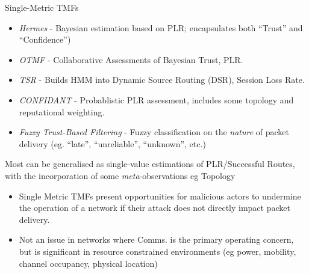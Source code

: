 \documentclass{beamer}
\begin{document}
\begin{frame}[allowframebreaks]{Single-Metric TMFs}
  \begin{itemize}
    \item \emph{Hermes} \cite{Zouridaki2005} - Bayesian estimation based on PLR; encapsulates both ``Trust'' and ``Confidence'')
    \item \emph{OTMF} \cite{Li2008} - Collaborative Assessments of Bayesian Trust, PLR.
    \item \emph{TSR} \cite{Moe2008a} - Builds HMM into Dynamic Source Routing (DSR), Session Loss Rate.
    \item \emph{CONFIDANT} \cite{Buchegger2002} - Probablistic PLR assessment, includes some topology and reputational weighting.
    \item \emph{Fuzzy Trust-Based Filtering} \cite{Luo2008} - Fuzzy classification on the \emph{nature} of packet delivery (eg. ``late'', ``unreliable'', ``unknown'', etc.)
  \end{itemize}
  Most can be generalised as single-value estimations of PLR/Successful Routes, with the incorporation of some \emph{meta}-observations eg Topology
  \framebreak
  \begin{itemize}
  \item
    Single Metric TMFs present opportunities for malicious actors to undermine the operation of a network if their attack does not directly impact packet delivery. 
  \item 
    Not an issue in networks where Comms. is the primary operating concern, but is significant in resource constrained environments (eg power, mobility, channel occupancy, physical location)
  \end{itemize}

\end{frame}
\end{document}
